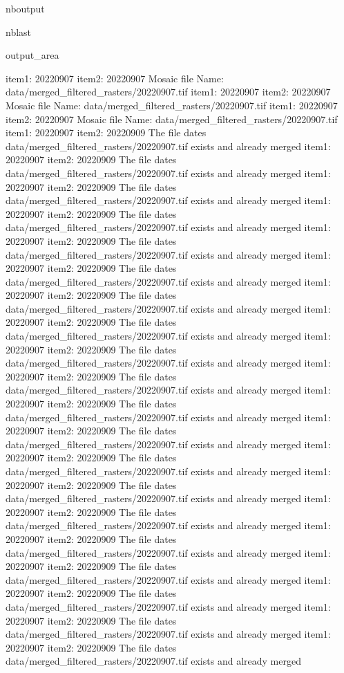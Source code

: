 \documentclass[letterpaper,10pt]{sphinxmanual}
\begin{document}
\begin{sphinxuseclass}{nboutput}
\begin{sphinxuseclass}{nblast}
{\begin{sphinxuseclass}{output_area}
\begin{sphinxuseclass}{}
\begin{sphinxVerbatim}[commandchars=\\\{\}]
item1:  20220907
item2:  20220907
Mosaic file Name:  data/merged\_filtered\_rasters/20220907.tif
item1:  20220907
item2:  20220907
Mosaic file Name:  data/merged\_filtered\_rasters/20220907.tif
item1:  20220907
item2:  20220907
Mosaic file Name:  data/merged\_filtered\_rasters/20220907.tif
item1:  20220907
item2:  20220909
The file dates data/merged\_filtered\_rasters/20220907.tif exists and already merged
item1:  20220907
item2:  20220909
The file dates data/merged\_filtered\_rasters/20220907.tif exists and already merged
item1:  20220907
item2:  20220909
The file dates data/merged\_filtered\_rasters/20220907.tif exists and already merged
item1:  20220907
item2:  20220909
The file dates data/merged\_filtered\_rasters/20220907.tif exists and already merged
item1:  20220907
item2:  20220909
The file dates data/merged\_filtered\_rasters/20220907.tif exists and already merged
item1:  20220907
item2:  20220909
The file dates data/merged\_filtered\_rasters/20220907.tif exists and already merged
item1:  20220907
item2:  20220909
The file dates data/merged\_filtered\_rasters/20220907.tif exists and already merged
item1:  20220907
item2:  20220909
The file dates data/merged\_filtered\_rasters/20220907.tif exists and already merged
item1:  20220907
item2:  20220909
The file dates data/merged\_filtered\_rasters/20220907.tif exists and already merged
item1:  20220907
item2:  20220909
The file dates data/merged\_filtered\_rasters/20220907.tif exists and already merged
item1:  20220907
item2:  20220909
The file dates data/merged\_filtered\_rasters/20220907.tif exists and already merged
item1:  20220907
item2:  20220909
The file dates data/merged\_filtered\_rasters/20220907.tif exists and already merged
item1:  20220907
item2:  20220909
The file dates data/merged\_filtered\_rasters/20220907.tif exists and already merged
item1:  20220907
item2:  20220909
The file dates data/merged\_filtered\_rasters/20220907.tif exists and already merged
item1:  20220907
item2:  20220909
The file dates data/merged\_filtered\_rasters/20220907.tif exists and already merged
item1:  20220907
item2:  20220909
The file dates data/merged\_filtered\_rasters/20220907.tif exists and already merged
item1:  20220907
item2:  20220909
The file dates data/merged\_filtered\_rasters/20220907.tif exists and already merged
item1:  20220907
item2:  20220909
The file dates data/merged\_filtered\_rasters/20220907.tif exists and already merged
item1:  20220907
item2:  20220909
The file dates data/merged\_filtered\_rasters/20220907.tif exists and already merged
item1:  20220907
item2:  20220909
The file dates data/merged\_filtered\_rasters/20220907.tif exists and already merged

\end{sphinxVerbatim}
\end{sphinxuseclass}
\end{sphinxuseclass}}
\end{sphinxuseclass}
\end{sphinxuseclass}
\end{document}
